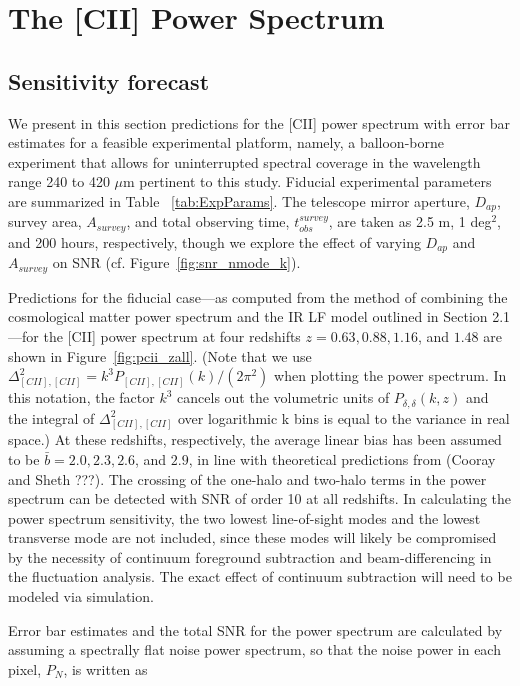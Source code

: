 \documentclass[12pt,preprint]{emulateapj}
\begin{document}
\section{The [CII] Power Spectrum}

\subsection{Sensitivity forecast}

We present in this section predictions for the [CII] power spectrum with error bar estimates for a feasible experimental platform, namely, a balloon-borne experiment that allows for uninterrupted spectral coverage in the wavelength range 240 to 420 $\mu$m pertinent to this study. Fiducial experimental parameters are summarized in Table ~\ref{tab:ExpParams}. The telescope mirror aperture, $D_{ap}$, survey area, $A_{survey}$, and total observing time, $t_{obs}^{survey}$, are taken as 2.5 m, 1 deg$^2$, and 200 hours, respectively, though we explore the effect of varying $D_{ap}$ and $A_{survey}$ on SNR (cf. Figure~\ref{fig:snr_nmode_k}).

Predictions for the fiducial case---as computed from the method of combining the cosmological matter power spectrum and the IR LF model outlined in Section 2.1---for the  [CII] power spectrum at four redshifts $z = 0.63, 0.88, 1.16$, and $1.48$ are shown in Figure~\ref{fig:pcii_zall}. (Note that we use  $\Delta_{[CII],[CII]}^2 = k^3 P_{[CII], [CII]}(k)/(2\pi^2)$ when plotting the power spectrum. In this notation, the factor $k^3$ cancels out the volumetric units of $P_{\delta,\delta}(k,z)$ and the integral of $\Delta_{[CII],[CII]}^2$ over logarithmic k bins is equal to the variance in real space.) At these redshifts, respectively, the average linear bias has been assumed to be $\bar{b} = 2.0, 2.3, 2.6$, and $2.9$, in line with theoretical predictions from (Cooray and Sheth ???). The crossing of the one-halo and two-halo terms in the power spectrum can be detected with SNR of order 10 at all redshifts.  In calculating the power spectrum sensitivity, the two lowest line-of-sight modes and the lowest transverse mode are not included, since these modes will likely be compromised by the necessity of continuum foreground subtraction and beam-differencing in the fluctuation analysis. The exact effect of continuum subtraction will need to be modeled via simulation. 

Error bar estimates and the total SNR for the power spectrum are calculated by assuming a spectrally flat noise power spectrum, so that the noise power in each pixel, $P_{N}$, is written as
\end{document}
